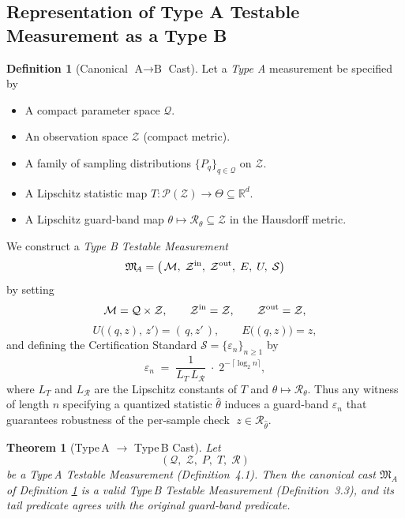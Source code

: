 \documentclass[12pt]{article}
\theoremstyle{definition}
\newtheorem{definition}{Definition}[section]
\theoremstyle{plain}
\newtheorem{theorem}{Theorem}[section]
\begin{document}
\subsection{Representation of Type A Testable Measurement as a Type B}
\begin{definition}[Canonical \(\text{A}\to\text{B}\) Cast]
\label{def:canonical-A-to-B}
Let a \emph{Type A} measurement be specified by
\begin{itemize}
  \item A compact parameter space \(\mathcal Q\).
  \item An observation space \(\mathcal Z\) (compact metric).
  \item A family of sampling distributions \(\{P_q\}_{q\in\mathcal Q}\) on \(\mathcal Z\).
  \item A Lipschitz statistic map \(T:\mathcal P(\mathcal Z)\to\Theta\subseteq\mathbb R^d\).
  \item A Lipschitz guard‐band map \(\theta\mapsto\mathcal R_\theta\subseteq\mathcal Z\) in the Hausdorff metric.
\end{itemize}
We construct a \emph{Type B Testable Measurement}
\[
  \mathfrak M_{\!A}
  =\bigl(\,
     \mathcal M,\;
     \mathcal Z^{\rm in},\;
     \mathcal Z^{\rm out},\;
     E,\;
     U,\;
     \mathcal S
   \bigr)
\]
by setting
\[
  \mathcal M = \mathcal Q \times \mathcal Z,
  \qquad
  \mathcal Z^{\rm in} = \mathcal Z,
  \qquad
  \mathcal Z^{\rm out} = \mathcal Z,
\]
\[
  U\bigl((q,z),\,z'\bigr) = (\,q,z'\,),
  \qquad
  E\bigl((q,z)\bigr) = z,
\]
and defining the Certification Standard \(\mathcal S=\{\varepsilon_n\}_{n\ge1}\) by
\[
  \varepsilon_n \;=\;\frac{1}{L_T\,L_{\mathcal R}}\;\cdot\;2^{-\,\lceil \log_2 n\rceil},
\]
where \(L_T\) and \(L_{\mathcal R}\) are the Lipschitz constants of \(T\) and \(\theta\mapsto\mathcal R_\theta\).  Thus any witness of length \(n\) specifying a quantized statistic \(\widehat\theta\) induces a guard‐band \(\varepsilon_n\) that guarantees robustness of the per‐sample check
\(\;z\in\mathcal R_{\widehat\theta}\).
\end{definition}

\begin{theorem}[Type\,A \(\to\) Type\,B Cast]
\label{prop:A-to-B-cast}
Let 
\[
  (\mathcal Q,\;\mathcal Z,\;P,\;T,\;\mathcal R)
\]
be a Type\,A Testable Measurement (Definition 4.1).  Then the canonical cast
\(\mathfrak M_A\) of Definition \ref{def:canonical-A-to-B}
is a valid Type\,B Testable Measurement (Definition 3.3), and its tail predicate
agrees with the original guard‑band predicate.
\end{theorem}
\end{document}
